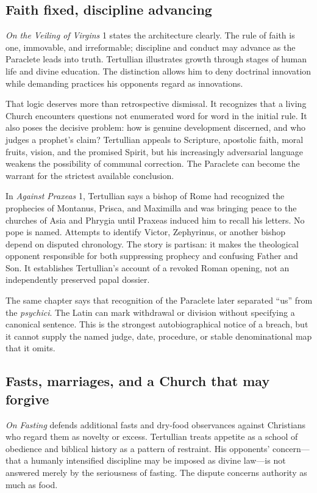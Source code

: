\subsection{Faith fixed, discipline advancing}

\emph{On the Veiling of Virgins} 1 states the architecture clearly. The rule of
faith is one, immovable, and irreformable; discipline and conduct may advance as
the Paraclete leads into truth. Tertullian illustrates growth through stages of
human life and divine education. The distinction allows him to deny doctrinal
innovation while demanding practices his opponents regard as innovations.

That logic deserves more than retrospective dismissal. It recognizes that a
living Church encounters questions not enumerated word for word in the initial
rule. It also poses the decisive problem: how is genuine development discerned,
and who judges a prophet's claim? Tertullian appeals to Scripture, apostolic
faith, moral fruits, vision, and the promised Spirit, but his increasingly
adversarial language weakens the possibility of communal correction. The
Paraclete can become the warrant for the strictest available conclusion.

In \emph{Against Praxeas} 1, Tertullian says a bishop of Rome had recognized the
prophecies of Montanus, Prisca, and Maximilla and was bringing peace to the
churches of Asia and Phrygia until Praxeas induced him to recall his letters.
No pope is named. Attempts to identify Victor, Zephyrinus, or another bishop
depend on disputed chronology. The story is partisan: it makes the theological
opponent responsible for both suppressing prophecy and confusing Father and
Son. It establishes Tertullian's account of a revoked Roman opening, not an
independently preserved papal dossier.

The same chapter says that recognition of the Paraclete later separated ``us''
from the \emph{psychici}. The Latin can mark withdrawal or division without
specifying a canonical sentence. This is the strongest autobiographical notice
of a breach, but it cannot supply the named judge, date, procedure, or stable
denominational map that it omits.

\subsection{Fasts, marriages, and a Church that may forgive}

\emph{On Fasting} defends additional fasts and dry-food observances against
Christians who regard them as novelty or excess. Tertullian treats appetite as
a school of obedience and biblical history as a pattern of restraint. His
opponents' concern---that a humanly intensified discipline may be imposed as
divine law---is not answered merely by the seriousness of fasting. The dispute
concerns authority as much as food.

